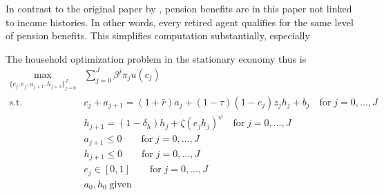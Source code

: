 In contrast to the original paper by \cite{LudwigSchelkleVogel2012}, pension benefits are in this paper not linked to income histories. In other words, every retired agent qualifies for the same level of pension benefits. This simplifies computation substantially, especially



The household optimization problem in the stationary economy thus is
\begin{align*}
    \max_{\{c_j, e_j, a_{j+1}, h_{j+1}\}_{j=0}^J} & \sum_{j=0}^J \beta^j \pi_{j} u(c_j) \\
    \text{s.t.} \;  & c_j + a_{j+1} = (1+\bar{r}) a_j + (1-\tau) (1-e_j) z_j h_j + b_j \quad\text{for}\; j=0,\dots,J \\
                    & h_{j+1} = (1-\delta_h) h_j + \zeta (e_j h_j)^\psi \quad\text{for}\; j=0,\dots,J \\
                    & a_{j+1} \leq 0 \quad \quad\text{for}\; j=0,\dots,J \\
                    & h_{j+1} \leq 0 \quad \quad\text{for}\; j=0,\dots,J \\
                    & e_j \in [0, 1] \quad \quad\text{for}\; j=0,\dots,J \\
                    & a_0, h_0 \;\text{given}
\end{align*}


